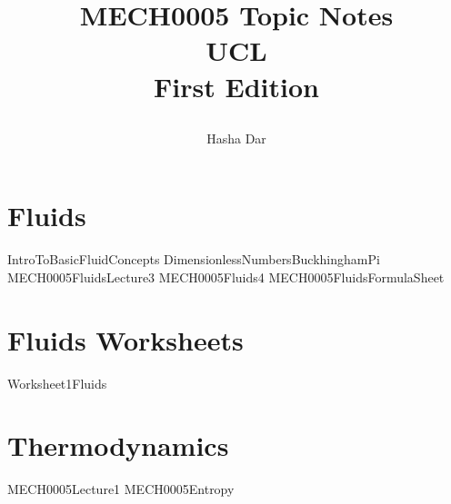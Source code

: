 \documentclass[12pt,a4paper, twoside]{report}
\numberwithin{equation}{section}
\begin{document}
\title{
  {MECH0005 Topic Notes}\\
  {\large UCL}\\
  {\large First Edition}
  \author{Hasha Dar}
}
\maketitle
\tableofcontents
\chapter{Fluids}
{IntroToBasicFluidConcepts}
{DimensionlessNumbersBuckhinghamPi}
{MECH0005FluidsLecture3}
{MECH0005Fluids4}
{MECH0005FluidsFormulaSheet}
\chapter{Fluids Worksheets}
{Worksheet1Fluids}
\chapter{Thermodynamics}
{MECH0005Lecture1}
{MECH0005Entropy}
\end{document}

